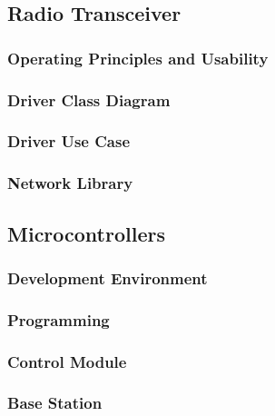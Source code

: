 
\subsection{Radio Transceiver}

\subsubsection{Operating Principles and Usability}

\subsubsection{Driver Class Diagram}

\subsubsection{Driver Use Case}

\subsubsection{Network Library}
\label{sec:network-library}

\subsection{Microcontrollers}

\subsubsection{Development Environment}

\subsubsection{Programming}

\subsubsection{Control Module}

\subsubsection{Base Station}

